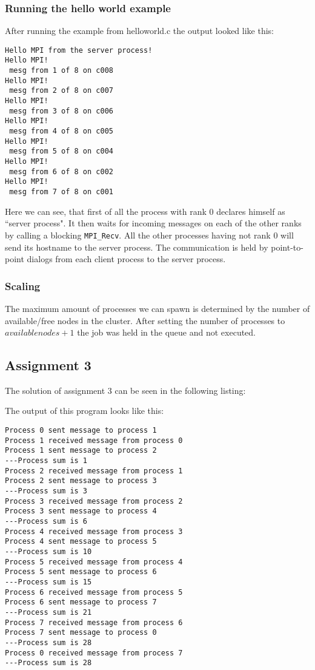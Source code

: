 	\subsubsection*{Running the hello world example}
	After running the example from helloworld.c the output looked like this:
\begin{verbatim}
Hello MPI from the server process!
Hello MPI!
 mesg from 1 of 8 on c008
Hello MPI!
 mesg from 2 of 8 on c007
Hello MPI!
 mesg from 3 of 8 on c006
Hello MPI!
 mesg from 4 of 8 on c005
Hello MPI!
 mesg from 5 of 8 on c004
Hello MPI!
 mesg from 6 of 8 on c002
Hello MPI!
 mesg from 7 of 8 on c001
\end{verbatim}
	Here we can see, that first of all the process with rank 0 declares himself as ``server process". It then waits for incoming messages on each of the other ranks by calling a blocking \texttt{MPI\_Recv}. All the other processes having not rank 0 will send its hostname to the server process. The communication is held by point-to-point dialogs from each client process to the server process.
	\subsubsection*{Scaling} 
	The maximum amount of processes we can spawn is determined by the number of available/free nodes in the cluster. After setting the number of processes to $available nodes + 1$ the job was held in the queue and not executed.


	\subsection{Assignment 3}
		The solution of assignment 3 can be seen in the following listing:

		
		The output of this program looks like this:

\begin{verbatim}	
Process 0 sent message to process 1
Process 1 received message from process 0
Process 1 sent message to process 2
---Process sum is 1
Process 2 received message from process 1
Process 2 sent message to process 3
---Process sum is 3
Process 3 received message from process 2
Process 3 sent message to process 4
---Process sum is 6
Process 4 received message from process 3
Process 4 sent message to process 5
---Process sum is 10
Process 5 received message from process 4
Process 5 sent message to process 6
---Process sum is 15
Process 6 received message from process 5
Process 6 sent message to process 7
---Process sum is 21
Process 7 received message from process 6
Process 7 sent message to process 0
---Process sum is 28
Process 0 received message from process 7
---Process sum is 28
\end{verbatim}

